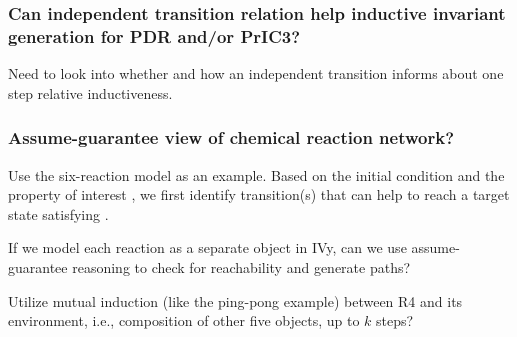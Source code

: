 \subsubsection*{Can independent transition relation help inductive
	invariant generation for PDR and/or PrIC3?} Need to look into
whether and how an independent transition informs about one step
relative inductiveness.

\subsubsection*{Assume-guarantee view of chemical reaction network?}
Use the six-reaction model as an example. Based on the initial
condition and the property of interest \targetSt, we first identify
transition(s) that can help to reach a target state satisfying
\targetSt. 

If we model each reaction as a separate object in IVy, can we use
assume-guarantee reasoning to check for reachability and generate paths?

Utilize mutual induction (like the ping-pong example) between R4 and
its environment, i.e., composition of other five objects, up to $k$
steps?